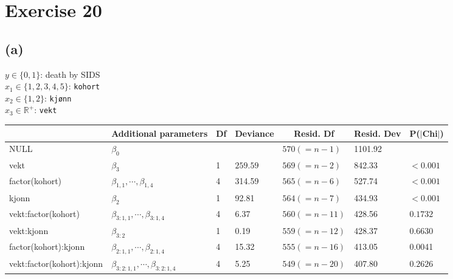 \section*{Exercise 20}
\subsection*{(a)}
$y \in \{0,1\}$: death by SIDS\\
$x_{1} \in \{1,2,3,4,5\}$: \texttt{kohort}\\
$x_{2} \in \{1,2\}$: \texttt{kj{\o}nn}\\
$x_{3} \in \mathbb{R}^{+}$: \texttt{vekt}\\

\begin{table}[ht]
\centering
\begin{tabular}{l|l|l|l|l|l|l|}
\cline{2-7}
\multicolumn{1}{c|}{} & Additional parameters & \multicolumn{1}{c|}{Df} & \multicolumn{1}{c|}{Deviance} & \multicolumn{1}{c|}{Resid. Df} & \multicolumn{1}{c|}{Resid. Dev} & P($\vert$Chi$\vert$) \\ \hline
%
\multicolumn{1}{|l|}{NULL} & $\beta_{0}$ & & & {\color[HTML]{3531FF} $570 (=n-1)$} & {\color[HTML]{3531FF} 1101.92} & \\ \hline
\multicolumn{1}{|l|}{vekt} & $\beta_{3}$ & 1 & $259.59$ & {\color[HTML]{3531FF} $569 (=n-2)$} & {\color[HTML]{3531FF} 842.33} & $< 0.001$ \\ \hline
\multicolumn{1}{|l|}{factor(kohort)} & $\beta_{1,1}, \cdots, \beta_{1,4}$ & 4 & 314.59 & $565 (=n-6)$ & {\color[HTML]{3531FF} 527.74} & $< 0.001$ \\ \hline
\multicolumn{1}{|l|}{kjonn} & $\beta_{2}$ & 1 & 92.81 & $564 (=n-7)$ & {\color[HTML]{3531FF} 434.93} & $< 0.001$ \\ \hline
\multicolumn{1}{|l|}{vekt:factor(kohort)} & $\beta_{3:1,1}, \cdots, \beta_{3:1,4}$ & 4 & 6.37 & $560 (=n-11)$ & {\color[HTML]{3531FF} 428.56} & $0.1732$ \\ \hline
\multicolumn{1}{|l|}{vekt:kjonn} & $\beta_{3:2}$ & 1 & 0.19 & $559 (=n-12)$ & {\color[HTML]{3531FF} 428.37} & $0.6630$ \\ \hline
\multicolumn{1}{|l|}{factor(kohort):kjonn} & $\beta_{2:1,1}, \cdots, \beta_{2:1,4}$ & 4 & 15.32 & $555 (=n-16)$ & {\color[HTML]{3531FF} 413.05} & {\color[HTML]{3531FF} 0.0041} \\ \hline
\multicolumn{1}{|l|}{vekt:factor(kohort):kjonn} & $\beta_{3:2:1,1}, \cdots, \beta_{3:2:1,4}$ & 4 & 5.25 & $549 (=n-20)$ & {\color[HTML]{3531FF} 407.80} & $0.2626$\\ \hline
\end{tabular}
\end{table}

